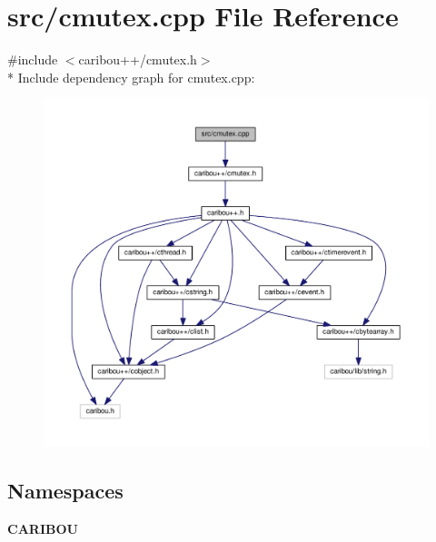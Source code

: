 \section{src/cmutex.cpp File Reference}
\label{cmutex_8cpp}
{\ttfamily \#include $<$caribou++/cmutex.\+h$>$}\\*
Include dependency graph for cmutex.\+cpp\+:
\nopagebreak
\begin{figure}[H]
\begin{center}
\leavevmode
\includegraphics[width=350pt]{cmutex_8cpp__incl}
\end{center}
\end{figure}
\subsection*{Namespaces}
\begin{DoxyCompactItemize}
\item 
 {\bf C\+A\+R\+I\+B\+OU}
\end{DoxyCompactItemize}
